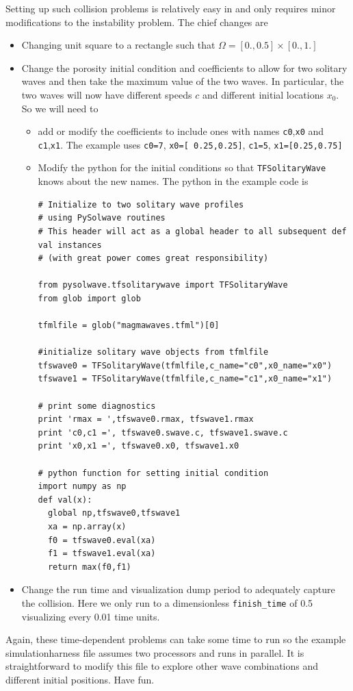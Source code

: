 Setting up such collision problems is relatively easy in \TF{} and
only requires minor modifications to the instability problem.  The
chief changes are
\begin{itemize}
\item Changing unit square to a rectangle such that
  $\Omega=[0.,0.5]\times[0.,1.]$
\item Change the porosity initial condition and coefficients to allow
  for two solitary waves and then take the maximum value of the two
  waves.  In particular,  the two waves will now have different speeds $c$
  and different initial locations $x_{0}$.  So we will need to
  \begin{itemize}
  \item add or modify the coefficients to include ones with names
    \texttt{c0},\texttt{x0} and \texttt{c1},\texttt{x1}.  The example
    uses \texttt{c0=7}, \texttt{x0=[ 0.25,0.25]}, \texttt{c1=5}, \texttt{x1=[0.25,0.75]}
  \item Modify the python for the initial conditions so that
    \texttt{TFSolitaryWave} knows about the new names.  The python in
    the example code is
    \begin{lstlisting}[style=python]
# Initialize to two solitary wave profiles 
# using PySolwave routines 
# This header will act as a global header to all subsequent def val instances
# (with great power comes great responsibility)

from pysolwave.tfsolitarywave import TFSolitaryWave
from glob import glob

tfmlfile = glob("magmawaves.tfml")[0]

#initialize solitary wave objects from tfmlfile
tfswave0 = TFSolitaryWave(tfmlfile,c_name="c0",x0_name="x0")
tfswave1 = TFSolitaryWave(tfmlfile,c_name="c1",x0_name="x1")

# print some diagnostics
print 'rmax = ',tfswave0.rmax, tfswave1.rmax
print 'c0,c1 =', tfswave0.swave.c, tfswave1.swave.c
print 'x0,x1 =', tfswave0.x0, tfswave1.x0

# python function for setting initial condition
import numpy as np
def val(x):
  global np,tfswave0,tfswave1
  xa = np.array(x)
  f0 = tfswave0.eval(xa)
  f1 = tfswave1.eval(xa)
  return max(f0,f1)
    \end{lstlisting}

  \end{itemize}
\item Change the run time and visualization dump period to adequately
  capture the collision. Here we only run to a dimensionless \texttt{finish\_time}
  of 0.5 visualizing every 0.01 time units.
\end{itemize}

Again, these time-dependent problems can take some time to run so the
example simulationharness file assumes two processors and runs in parallel.
It is straightforward to modify this file to explore other wave
combinations and different initial positions.  Have fun.

